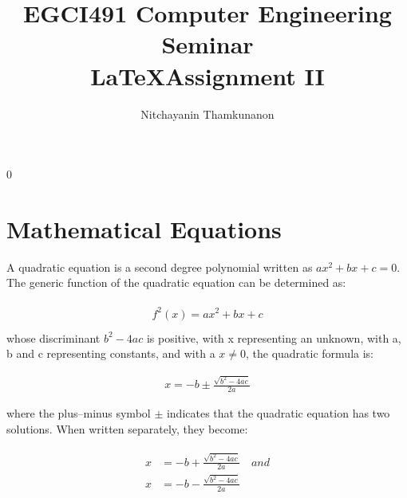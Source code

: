 \documentclass[a4paper]{article} %
\title{EGCI491 Computer Engineering Seminar\\ \LaTeX \space Assignment II}
\author{Nitchayanin Thamkunanon}
\begin{document}
	\maketitle
	\setcounter{section} {0}%
	\section{Mathematical Equations } %

	\noindent A quadratic equation is a second degree polynomial written as $ax^2+bx+c=0$. The generic function of the quadratic equation can be determined as:
	
	\begin{align}
		\begin{split}
			f^2(x) = ax^2+bx+c\\
		\end{split}
	\end{align}
	\noindent whose discriminant  $b^2-4ac$ is positive, with x representing an unknown, with a, b and c representing constants, and with a $x\not=0$, the quadratic formula is:
	
	\begin{align}
	x = - b\pm\frac{\sqrt{b^2 - 4ac}}{2a}
	\end{align}
	
	\noindent where the plus–minus symbol $\pm$ indicates that the quadratic equation has two solutions. When written separately, they become:
	
		\begin{align}
			\begin{split}
				x &= - b + \frac{\sqrt{b^2 - 4ac}}{2a} \quad and \\
				  x &= - b - \frac{\sqrt{b^2 - 4ac}}{2a}
		     \end{split}
		\end{align}
			
	
\end{document}
